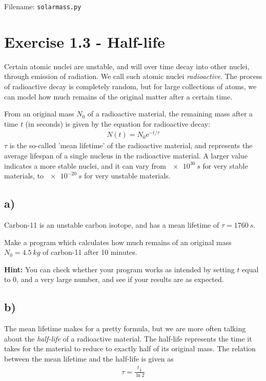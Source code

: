 \documentclass[10pt,a4paper]{article}
\renewcommand{\exp}{\mathrm{e}^}
\newcommand{\halflife}{t_{\frac{1}{2}}}
\begin{document}
	Filename: \texttt{solarmass.py}


\section*{Exercise 1.3 - Half-life}

Certain atomic nuclei are unstable, and will over time decay into other nuclei, through emission of radiation. We call such atomic nuclei \textit{radioactive}. The process of radioactive decay is completely random, but for large collections of atoms, we can model how much remains of the original matter after a certain time.

From an original mass $N_0$ of a radioactive material, the remaining mass after a time $t$ (in seconds) is given by the equation for radioactive decay:
\begin{align}
N(t) = N_0\exp{-t/\tau}
\end{align}
$\tau$ is the so-called 'mean lifetime' of the radioactive material, and represents the average lifespan of a single nucleus in the radioactive material. A larger value indicates a more stable nuclei, and it can vary from $\SI{e30}{s}$ for very stable materials, to $\SI{e-20}{s}$ for very unstable materials.


\subsection*{a)}
Carbon-11 is an unstable carbon isotope, and has a mean lifetime of $\tau = \SI{1760}{s}$.

Make a program which calculates how much remains of an original mass $N_0 = \SI{4.5}{kg}$ of carbon-11 after 10 minutes.

\textbf{Hint:} You can check whether your program works as intended by setting $t$ equal to 0, and a very large number, and see if your results are as expected.


\subsection*{b)}
The mean lifetime makes for a pretty formula, but we are more often talking about the \textit{half-life} of a radioactive material. The half-life represents the time it takes for the material to reduce to exactly half of its original mass. The relation between the mean lifetime and the half-life is given as
\begin{align*}
\tau = \frac{\halflife}{\ln 2}
\end{align*}
\end{document}
